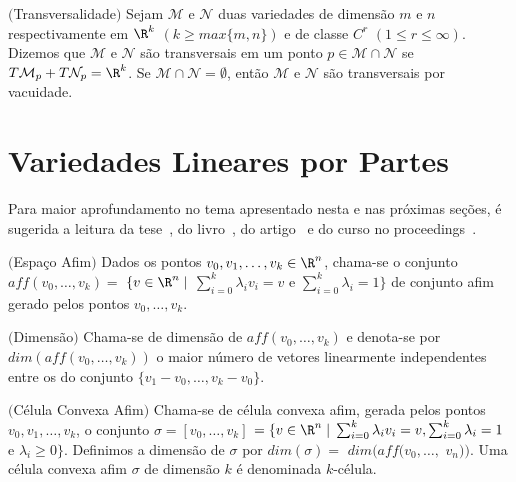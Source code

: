 \begin{defi} $($Transversalidade$)$ \label{def_TR}
Sejam $\mathcal{M}$ e $\mathcal{N}$ duas variedades de dimensão $m$ e $n$ respectivamente em $\R^k$ $(k \ge max\{m , n\})$ e de classe $C^r$ $(1 \le r \le \infty)$. 
Dizemos que $\mathcal{M}$ e $\mathcal{N}$ são transversais em um ponto $p \in \mathcal{M} \cap \mathcal{N}$ se $T\mathcal{M}_p + T\mathcal{N}_p = \R^k$.
Se $\mathcal{M} \cap \mathcal{N} = \emptyset$, ent\~ao $\mathcal{M}$ e $\mathcal{N}$ s\~ao transversais por vacuidade.
\end{defi}




\section{Variedades Lineares por Partes}\label{cap_var_lin_par}

Para maior aprofundamento no tema apresentado nesta e nas pr\'oximas seções, \'e sugerida a leitura da tese~\cite{Cas92}, do livro~\cite{AlGe90}, do artigo~\cite{Cas06} e do curso no proceedings~\cite{Eaves76}. 

\begin{defi} $($Espaço Afim$)$
Dados os pontos $v_{0},v_{1},\ldots,v_{k} \in \R^{n}$, chama-se o conjunto 
$aff(v_{0},\ldots,v_{k}) =$ 
$\{ v \in  \R^{n} \; |$ $ \sum_{i=0}^{k} \lambda_{i} v_{i} = v$ e 
$\sum_{i=0}^{k} \lambda_{i} = 1\}$ de conjunto afim gerado pelos pontos
$v_{0},\ldots,v_{k}$.  
\end{defi}

\begin{defi} $($Dimensão$)$
Chama-se de dimens\~ao de $aff(v_{0},\ldots,v_{k})$ 
e denota-se por $dim(aff(v_{0},\ldots,v_{k}))$ o maior n\'umero de vetores 
linearmente independentes entre os do conjunto
$\{v_{1}-v_{0},\ldots,v_{k}-v_{0}\}$.
\end{defi}

\begin{defi} $($Célula Convexa Afim$)$
Chama-se de c\'elula convexa afim, gerada pelos
pontos $v_{0},v_{1},\ldots,v_{k}$, o conjunto 
$\sigma = [v_{0},\ldots,v_{k}]$ $ = \{ v \in  \R^{n} \; | \;
\sum_{i=0}^{k} \lambda_{i} v_{i} = v, \sum_{i=0}^{k} \lambda_{i} = 1$
e $\lambda_{i} \geq 0 \}$. Definimos a dimens\~ao de $\sigma$ por
$dim(\sigma) =$ $dim(aff(v_{0},\ldots,$ $v_{n}))$. 
Uma célula convexa afim $\sigma$ de dimensão $k$ é denominada $k$-célula.
\end{defi}

